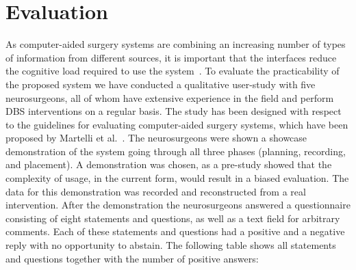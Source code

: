 \documentclass{vgtc}                          %
\begin{document}


\section{Evaluation}\label{sec:evaluation}
As computer-aided surgery systems are combining an increasing number of types of information from different sources, it is important that the interfaces reduce the cognitive load required to use the system~\cite{Visarius1997,Martelli2003}. To evaluate the practicability of the proposed system we have conducted a qualitative user-study with five neurosurgeons, all of whom have extensive experience in the field and perform DBS interventions on a regular basis. The study has been designed with respect to the guidelines for evaluating computer-aided surgery systems, which have been proposed by Martelli et al.~\cite{Martelli2003}. The neurosurgeons were shown a showcase demonstration of the system going through all three phases (planning, recording, and placement). A demonstration was chosen, as a pre-study showed that the complexity of usage, in the current form, would result in a biased evaluation. The data for this demonstration was recorded and reconstructed from a real intervention. After the demonstration the neurosurgeons answered a questionnaire consisting of eight statements and questions, as well as a text field for arbitrary comments. Each of these statements and questions had a positive and a negative reply with no opportunity to abstain. The following table shows all statements and questions together with the number of positive answers:

\end{document}
